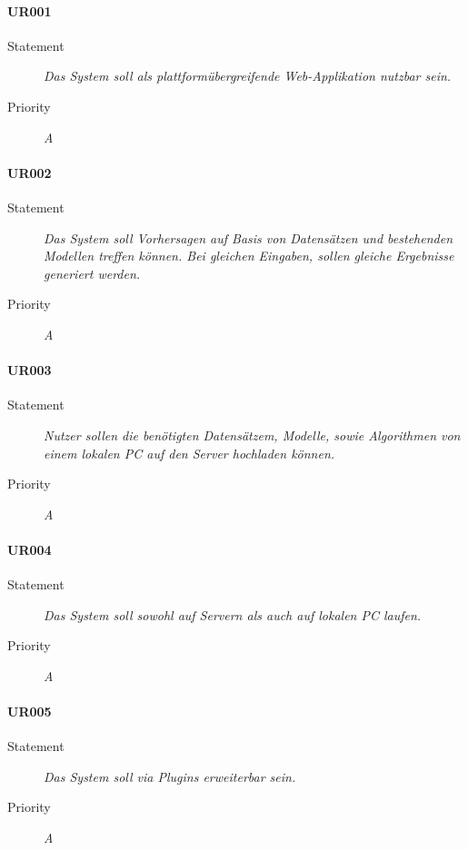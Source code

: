 \paragraph{UR001}
\begin{description}
\item [Statement] \textit{Das System soll als plattformübergreifende \gls{Web-Applikation} nutzbar sein.}
\item [Priority] \textit{A}
\end{description}

\paragraph{UR002}
\begin{description}
\item[Statement] \textit{Das System soll Vorhersagen auf Basis von Datensätzen und bestehenden Modellen treffen können. Bei gleichen Eingaben, sollen gleiche Ergebnisse generiert werden.}
\item[Priority] \textit{A}
\end{description}


\paragraph{UR003}
\begin{description}
\item[Statement] \textit{Nutzer sollen die benötigten Datensätzem, Modelle, sowie Algorithmen von einem lokalen PC auf den Server hochladen können.}
\item[Priority] \textit{A}
\end{description}

\paragraph{UR004}
\begin{description}
\item[Statement] \textit{Das System soll sowohl auf Servern als auch auf lokalen PC laufen.}
\item[Priority] \textit{A}
\end{description}

\paragraph{UR005}
\begin{description}
\item[Statement] \textit{Das System soll via \gls{Plugins} erweiterbar sein.}
\item[Priority] \textit{A}
\end{description}

